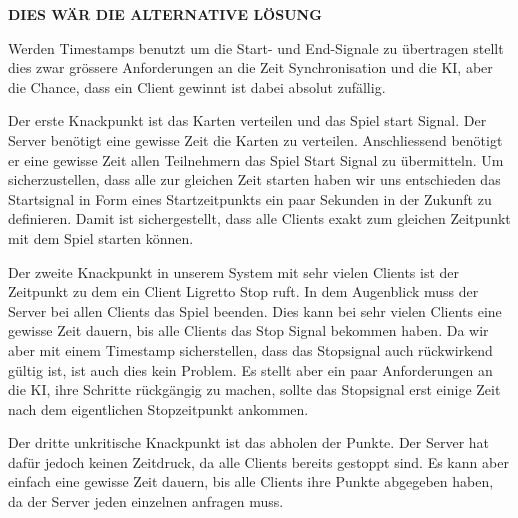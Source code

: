 \color{red}
\textbf{DIES WÄR DIE ALTERNATIVE LÖSUNG}
\color{black}

Werden Timestamps benutzt um die Start- und End-Signale zu übertragen stellt dies zwar grössere Anforderungen an die Zeit Synchronisation und die KI, aber die Chance, dass ein Client gewinnt ist dabei absolut zufällig.

Der erste Knackpunkt ist das Karten verteilen und das Spiel start Signal. Der Server benötigt eine gewisse Zeit die Karten zu verteilen. Anschliessend benötigt er eine gewisse Zeit allen Teilnehmern das Spiel Start Signal zu übermitteln. Um sicherzustellen, dass alle zur gleichen Zeit starten haben wir uns entschieden das Startsignal in Form eines Startzeitpunkts ein paar Sekunden in der Zukunft zu definieren. Damit ist sichergestellt, dass alle Clients exakt zum gleichen Zeitpunkt mit dem Spiel starten können.


Der zweite Knackpunkt in unserem System mit sehr vielen Clients ist der Zeitpunkt zu dem ein Client Ligretto Stop ruft. In dem Augenblick muss der Server bei allen Clients das Spiel beenden. Dies kann bei sehr vielen Clients eine gewisse Zeit dauern, bis alle Clients das Stop Signal bekommen haben. Da wir aber mit einem Timestamp sicherstellen, dass das Stopsignal auch rückwirkend gültig ist, ist auch dies kein Problem. Es stellt aber ein paar Anforderungen an die KI, ihre Schritte rückgängig zu machen, sollte das Stopsignal erst einige Zeit nach dem eigentlichen Stopzeitpunkt ankommen.

Der dritte unkritische Knackpunkt ist das abholen der Punkte. Der Server hat dafür jedoch keinen Zeitdruck, da alle Clients bereits gestoppt sind. Es kann aber einfach eine gewisse Zeit dauern, bis alle Clients ihre Punkte abgegeben haben, da der Server jeden einzelnen anfragen muss.



















